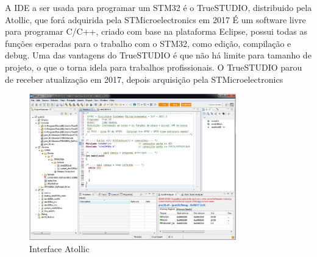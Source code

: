 A IDE a ser usada para programar um STM32 é o TrueSTUDIO, distribuido pela Atollic, que forá adquirida pela STMicroelectronics em 2017
É um software livre para programar C/C++, criado com base na plataforma Eclipse, possui todas as funções esperadas para o trabalho com o STM32, como edição, compilação e debug.
Uma das vantagens do TrueSTUDIO é que não há limite para tamanho de projeto, o que o torna idela para trabalhos profissionais. O TrueSTUDIO parou de receber atualização em 2017, depois arquisição pela STMicroelectronics
\cite{apostila_microprossados}


\begin{figure}[h]
	\centering
	\includegraphics[width=0.8\textwidth]{figures/atollic}
	\caption{Interface Atollic \cite{apostila_microprossados}}
\end{figure}

